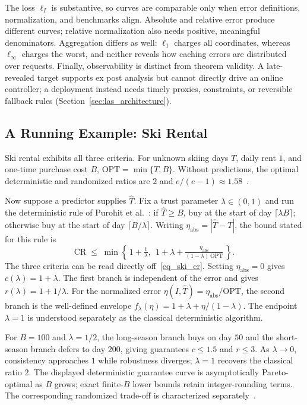 \documentclass[acmsmall,screen,nonacm]{acmart}
\theoremstyle{acmdefinition}%
\begin{document}
The loss $\ell_I$ is substantive, so curves are comparable only when error definitions, normalization, and benchmarks align. Absolute and relative error produce different curves; relative normalization also needs positive, meaningful denominators. Aggregation differs as well: $\ell_1$ charges all coordinates, whereas $\ell_\infty$ charges the worst, and neither reveals how caching errors are distributed over requests. Finally, observability is distinct from theorem validity. A late-revealed target supports ex post analysis but cannot directly drive an online controller; a deployment instead needs timely proxies, constraints, or reversible fallback rules (Section~\ref{sec:las_architecture}).

\subsection{A Running Example: Ski Rental}
\label{subsec:running}

Ski rental exhibits all three criteria. For unknown skiing days $T$, daily rent $1$, and one-time purchase cost $B$, $\mathrm{OPT}=\min\{T,B\}$. Without predictions, the optimal deterministic and randomized ratios are $2$ and $e/(e-1)\approx1.58$~\cite{karlin1988snoopy,karlin1994competitive}.

Now suppose a predictor supplies $\hat{T}$. Fix a trust parameter $\lambda \in (0,1)$ and run the deterministic rule of Purohit et al.~\cite{purohit2018improving}: if $\hat{T} \geq B$, buy at the start of day $\lceil \lambda B \rceil$; otherwise buy at the start of day $\lceil B/\lambda \rceil$. Writing $\eta_{\mathrm{abs}} = |\hat{T} - T|$, the bound stated for this rule is
\begin{equation}
    \mathrm{CR} \;\leq\; \min\!\left\{\, 1 + \tfrac{1}{\lambda},\ \ 1 + \lambda + \tfrac{\eta_{\mathrm{abs}}}{(1-\lambda)\,\mathrm{OPT}} \,\right\}.
    \label{eq_ski_cr}
\end{equation}
The three criteria can be read directly off~\eqref{eq_ski_cr}. Setting $\eta_{\mathrm{abs}} = 0$ gives $c(\lambda) = 1 + \lambda$. The first branch is independent of the error and gives $r(\lambda) = 1 + 1/\lambda$. For the normalized error $\eta(I,\hat T)=\eta_{\mathrm{abs}}/\mathrm{OPT}$, the second branch is the well-defined envelope $f_\lambda(\eta)=1+\lambda+\eta/(1-\lambda)$. The endpoint $\lambda=1$ is understood separately as the classical deterministic algorithm.

For $B=100$ and $\lambda=1/2$, the long-season branch buys on day $50$ and the short-season branch defers to day $200$, giving guarantees $c\leq1.5$ and $r\leq3$. As $\lambda\to0$, consistency approaches $1$ while robustness diverges; $\lambda=1$ recovers the classical ratio $2$. The displayed deterministic guarantee curve is asymptotically Pareto-optimal as $B$ grows; exact finite-$B$ lower bounds retain integer-rounding terms. The corresponding randomized trade-off is characterized separately~\cite{wei2020optimal}.
\end{document}
